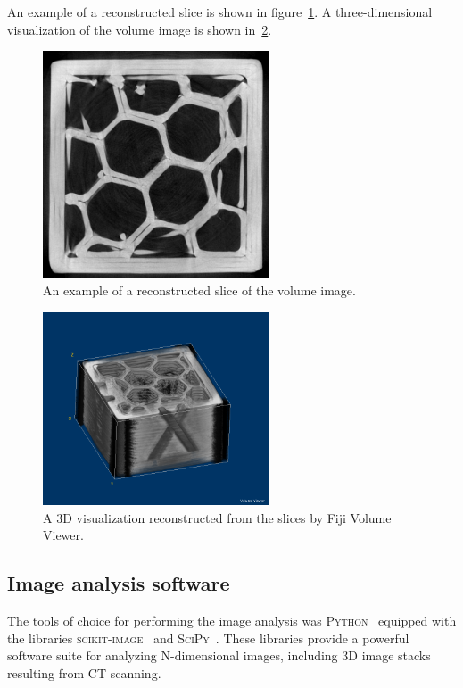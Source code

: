 \documentclass[a4paper,twoside,12pt]{article}
\begin{document}
An example of a reconstructed slice is shown in figure~\ref{fig:slice}. A three-dimensional visualization of the volume image is shown in~\ref{fig:volume_viewer}.
\begin{figure}[h]
    \centering
    \includegraphics[width=0.6\textwidth]{images/slice_example.png}
    \caption{An example of a reconstructed slice of the volume image.}
    \label{fig:slice}
\end{figure}
\begin{figure}
    \centering
    \includegraphics[width=0.6\textwidth]{images/volume_viewer.png}
    \caption{A 3D visualization reconstructed from the slices by Fiji Volume Viewer.}
    \label{fig:volume_viewer}
\end{figure}

\subsection{Image analysis software}
The tools of choice for performing the image analysis was \textsc{Python}~\cite{python} equipped with the libraries \textsc{scikit-image}~\cite{skimage} and \textsc{SciPy}~\cite{scipy}. These libraries provide a powerful software suite for analyzing N-dimensional images, including 3D image stacks resulting from CT scanning.
\end{document}
